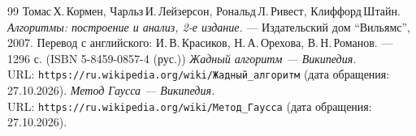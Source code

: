 \begin{thebibliography}{99}
Томас\,Х.\,Кормен, Чарльз\,И.\,Лейзерсон, Рональд\,Л.\,Ривест, Клиффорд\,Штайн.
{\itshape Алгоритмы: построение и анализ, 2-е издание.} --- Издательский дом \enquote{Вильямс}, 2007. Перевод с английского: И.\,В.\,Красиков, Н.\,А.\,Орехова, В.\,Н.\,Романов. --- 1296 с. (ISBN 5-8459-0857-4 (рус.))
{\itshape Жадный алгоритм --- Википедия.} \\URL: \texttt{https://ru.wikipedia.org/wiki/Жадный\_алгоритм} (дата обращения: 27.10.2026).
{\itshape Метод Гаусса --- Википедия.} \\URL: \texttt{https://ru.wikipedia.org/wiki/Метод\_Гаусса} (дата обращения: 27.10.2026).
\end{thebibliography}
\pagebreak